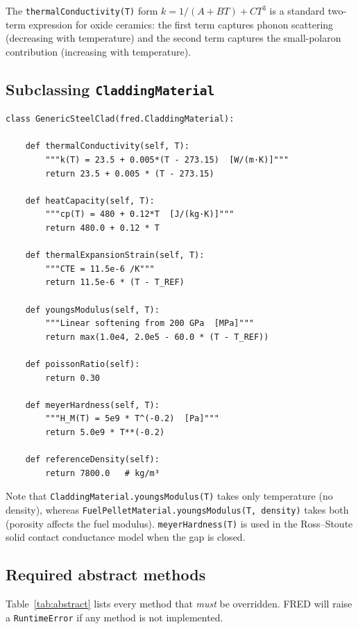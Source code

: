 \documentclass[11pt,a4paper]{article}
\begin{document}
The \texttt{thermalConductivity(T)} form
$k = 1/(A + BT) + CT^3$ is a standard two-term expression for oxide ceramics:
the first term captures phonon scattering (decreasing with temperature) and
the second term captures the small-polaron contribution (increasing with
temperature).

\subsection{Subclassing \texttt{CladdingMaterial}}

\begin{lstlisting}
class GenericSteelClad(fred.CladdingMaterial):

    def thermalConductivity(self, T):
        """k(T) = 23.5 + 0.005*(T - 273.15)  [W/(m·K)]"""
        return 23.5 + 0.005 * (T - 273.15)

    def heatCapacity(self, T):
        """cp(T) = 480 + 0.12*T  [J/(kg·K)]"""
        return 480.0 + 0.12 * T

    def thermalExpansionStrain(self, T):
        """CTE = 11.5e-6 /K"""
        return 11.5e-6 * (T - T_REF)

    def youngsModulus(self, T):
        """Linear softening from 200 GPa  [MPa]"""
        return max(1.0e4, 2.0e5 - 60.0 * (T - T_REF))

    def poissonRatio(self):
        return 0.30

    def meyerHardness(self, T):
        """H_M(T) = 5e9 * T^(-0.2)  [Pa]"""
        return 5.0e9 * T**(-0.2)

    def referenceDensity(self):
        return 7800.0   # kg/m³
\end{lstlisting}

Note that \texttt{CladdingMaterial.youngsModulus(T)} takes only temperature
(no density), whereas \texttt{FuelPelletMaterial.youngsModulus(T, density)}
takes both (porosity affects the fuel modulus).  \texttt{meyerHardness(T)}
is used in the Ross--Stoute solid contact conductance model when the gap is
closed.

\subsection{Required abstract methods}

Table~\ref{tab:abstract} lists every method that \emph{must} be overridden.
FRED will raise a \texttt{RuntimeError} if any method is not implemented.
\end{document}
